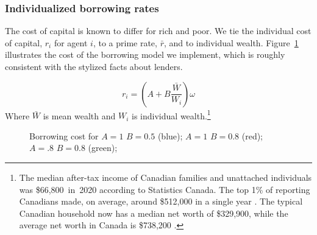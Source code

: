 \subsubsection{Individualized borrowing rates}\label{SS:BorowingRate}

 The cost of capital is known to differ for rich and poor. We tie the individual cost of capital,  $r_i$ for agent $i$, to a prime rate, $\bar r$, and to individual wealth. Figure~\ref{Fig:CapitalCost} illustrates the cost of the borrowing model we implement, which is  roughly consistent  with the stylized facts about lenders. 
 

 \[ r_i = (A + B \frac{\bar{W}}{W_i})\omega\]
Where $\bar{W}$ is mean wealth and $W_i$ is individual wealth.\footnote{The median after-tax income of Canadian families and unattached individuals was \$66,800 in 2020 according to Statistics Canada.%
 The top 1\% of reporting Canadians made, on average, around \$512,000 in a single year \cite{WEB_model-stats-can-canadian-incomes}. %
 The typical Canadian household now has a median net worth of \$329,900, while the average net worth in Canada is \$738,200 \cite{WEB-model-stats-can-median-net-worth}.  %
} 

\begin{figure}[!hb]
\begin{center}
\caption{Borrowing cost for  $A=1$  $B=0.5$ (blue);  $A=1$  $B=0.8$ (red);  $A=.8$  $B=0.8$ (green);}
\label{Fig:CapitalCost}
\end{center}
\end{figure}



